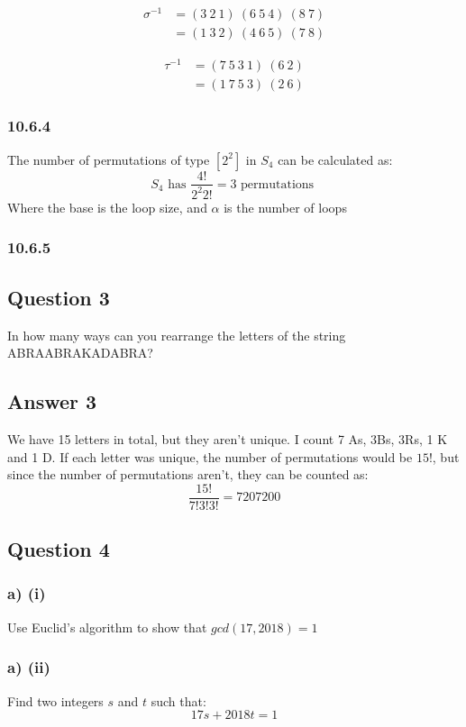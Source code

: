 \documentclass{article}
\begin{document}
	\[
	\begin{split}
	\sigma^{-1} & = (3 \ 2 \ 1) \ (6 \ 5 \ 4) \ (8 \ 7) \\
	& = (1 \ 3 \ 2) \ (4 \ 6 \ 5) \ (7 \ 8)
	\end{split}
	\]
	
	\[
	\begin{split}
	\tau^{-1} & = (7 \ 5 \ 3 \ 1) \ (6 \ 2) \\
	& = (1 \ 7 \ 5 \ 3) \ (2 \ 6)
	\end{split}
	\]
	
	\subsubsection*{10.6.4}
	The number of permutations of type $[2^2]$ in $S_4$ can be calculated as: 
	$$
	S_4 \text{ has }\frac{4!}{2^{2}2!} = 3 \text{ permutations }
	$$
	Where the base is the loop size, and $\alpha$ is the number of loops
	
	\subsubsection*{10.6.5}
	
	\subsection*{Question 3}
	In how many ways can you rearrange the letters of the string
	ABRAABRAKADABRA?
	
	\subsection*{Answer 3}
	We have 15 letters in total, but they aren't unique. I count 7 As, 3Bs, 3Rs, 1 K and 1 D.
	If each letter was unique, the number of permutations would be $15!$, but since the number of permutations aren't, they can be counted as:
	$$
	\frac{15!}{7!3!3!} = 7207200
	$$
	
	\subsection*{Question 4}
	\subsubsection*{a) (i)}
	Use Euclid's algorithm to show that $gcd(17,2018)=1$
	\subsubsection*{a) (ii)}
	Find two integers $s$ and $t$ such that:
	$$
	17s+2018t=1
	$$
	
\end{document}
